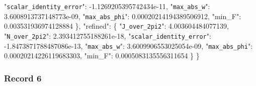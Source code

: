 \documentclass[
  10pt,
]{article}
\newenvironment{Shaded}{}{}
\newcommand{\DataTypeTok}[1]{\textcolor[rgb]{0.56,0.13,0.00}{#1}}
\newcommand{\FloatTok}[1]{\textcolor[rgb]{0.25,0.63,0.44}{#1}}
\newcommand{\FunctionTok}[1]{\textcolor[rgb]{0.02,0.16,0.49}{#1}}
\begin{document}
\begin{Shaded}
\begin{Highlighting}[]
    \DataTypeTok{"\nolinkurl{scalar_identity_error}"}\FunctionTok{:} \FloatTok{{-}1.1269205395742434e{-}11}\FunctionTok{,}
    \DataTypeTok{"\nolinkurl{max_abs_w}"}\FunctionTok{:} \FloatTok{3.6008913737148773e{-}09}\FunctionTok{,}
    \DataTypeTok{"\nolinkurl{max_abs_phi}"}\FunctionTok{:} \FloatTok{0.00020214194389506912}\FunctionTok{,}
    \DataTypeTok{"min\_F"}\FunctionTok{:} \FloatTok{0.003531936974128884}
  \FunctionTok{\},}
  \DataTypeTok{"refined"}\FunctionTok{:} \FunctionTok{\{}
    \DataTypeTok{"\nolinkurl{J_over_2pi2}"}\FunctionTok{:} \FloatTok{4.003604484077139}\FunctionTok{,}
    \DataTypeTok{"\nolinkurl{N_over_2pi2}"}\FunctionTok{:} \FloatTok{2.393412755188261e{-}18}\FunctionTok{,}
    \DataTypeTok{"\nolinkurl{scalar_identity_error}"}\FunctionTok{:} \FloatTok{{-}1.8473871788487086e{-}13}\FunctionTok{,}
    \DataTypeTok{"\nolinkurl{max_abs_w}"}\FunctionTok{:} \FloatTok{3.6009906553025054e{-}09}\FunctionTok{,}
    \DataTypeTok{"\nolinkurl{max_abs_phi}"}\FunctionTok{:} \FloatTok{0.00020214226119683303}\FunctionTok{,}
    \DataTypeTok{"min\_F"}\FunctionTok{:} \FloatTok{0.0005083135556311654}
  \FunctionTok{\}}
\FunctionTok{\}}
\end{Highlighting}
\end{Shaded}

\hypertarget{record-6-1}{%
\subsubsection{Record 6}\label{record-6-1}}
\end{document}
